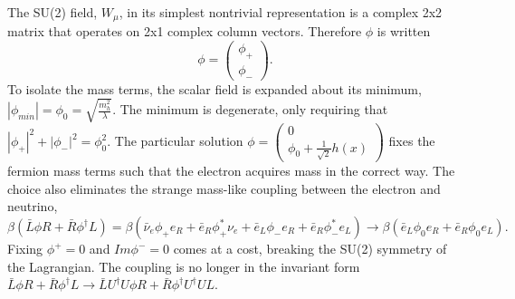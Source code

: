 The SU(2) field, $W_\mu$, in its simplest nontrivial representation is a complex 2x2 matrix that operates on 2x1 complex column vectors. Therefore $\phi$ is written 
\begin{equation}
\phi = 
\begin{pmatrix}
\phi_+ \\ \phi_-
\end{pmatrix}.
\end{equation}
To isolate the mass terms, the scalar field is expanded about its minimum, $|\phi_{min}| = \phi_0 = \sqrt{\frac{m_h^2}{\lambda}}$. The minimum is degenerate, only requiring that $|\phi_+|^{2} + |\phi_-|^{2} = \phi_0^2$. The particular solution $\phi = \begin{pmatrix} 0 \\ \phi_0 + \frac{1}{\sqrt{2}}h(x) \end{pmatrix}$ fixes the fermion mass terms such that the electron acquires mass in the correct way. The choice also eliminates the strange mass-like coupling between the electron and neutrino,
\begin{equation}
\beta(\bar{L}\phi R + \bar{R}\phi^\dagger L) = \beta(\bar{\nu}_e\phi_+e_R + \bar{e}_R\phi_+^{*}\nu_e + \bar{e}_L\phi_-e_R + \bar{e}_R\phi_-^{*}e_L) \rightarrow 
\beta(\bar{e}_L\phi_0e_R + \bar{e}_R\phi_0e_L).
\end{equation}
Fixing $\phi^+=0$ and $Im\phi^-=0$ comes at a cost, breaking the SU(2) symmetry of the Lagrangian. The coupling is no longer in the invariant form $\bar{L}\phi R + \bar{R}\phi^\dagger L \rightarrow \bar{L}U^\dagger U\phi R + \bar{R}\phi^\dagger U^\dagger UL$. 

